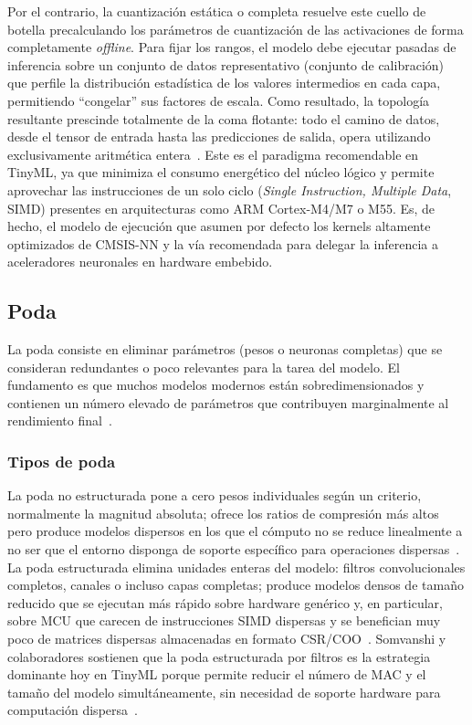 \documentclass[a4paper,12pt,twoside,final]{book}
\begin{document}
Por el contrario, la cuantización estática o completa resuelve este cuello de botella precalculando los parámetros de
cuantización de las activaciones de forma completamente \textit{offline}. Para fijar los rangos, el modelo debe
ejecutar pasadas de inferencia sobre un conjunto de datos representativo (conjunto de calibración) que perfile la
distribución estadística de los valores intermedios en cada capa, permitiendo ``congelar'' sus factores de escala. Como
resultado, la topología resultante prescinde totalmente de la coma flotante: todo el camino de datos, desde el tensor
de entrada hasta las predicciones de salida, opera utilizando exclusivamente aritmética
entera~\cite{gholami2022lowpowercv}. Este es el paradigma recomendable en TinyML, ya que minimiza el consumo
energético del núcleo lógico y permite aprovechar las instrucciones de un solo ciclo
(\textit{Single Instruction, Multiple Data}, SIMD) presentes en arquitecturas como ARM Cortex-M4/M7 o M55. Es, de
hecho, el modelo de ejecución que asumen por defecto los kernels altamente optimizados de CMSIS-NN y la vía
recomendada para delegar la inferencia a aceleradores neuronales en hardware embebido.

\subsection{Poda}
La poda consiste en eliminar parámetros (pesos o neuronas completas) que se consideran redundantes o poco relevantes
para la tarea del modelo. El fundamento es que muchos modelos modernos están sobredimensionados y contienen un número
elevado de parámetros que contribuyen marginalmente al rendimiento final~\cite{somvanshi2025acm}.

\subsubsection{Tipos de poda}
La poda no estructurada pone a cero pesos individuales según un criterio, normalmente la magnitud absoluta; ofrece
los ratios de compresión más altos pero produce modelos dispersos en los que el cómputo no se reduce linealmente a
no ser que el entorno disponga de soporte específico para operaciones dispersas~\cite{lê2025tist, cheng2024ieetpami}.
La poda estructurada elimina unidades enteras del modelo: filtros convolucionales completos, canales o incluso capas
completas; produce modelos densos de tamaño reducido que se ejecutan más rápido sobre hardware genérico y, en
particular, sobre MCU que carecen de instrucciones SIMD dispersas y se benefician muy poco de matrices dispersas
almacenadas en formato CSR/COO~\cite{somvanshi2025acm,liang2021neucom,cheng2024ieetpami}. Somvanshi y colaboradores
sostienen que la poda estructurada por filtros es la estrategia dominante hoy en TinyML porque permite reducir el
número de MAC y el tamaño del modelo simultáneamente, sin necesidad de soporte hardware para computación
dispersa~\cite{somvanshi2025acm}.\\
\end{document}
